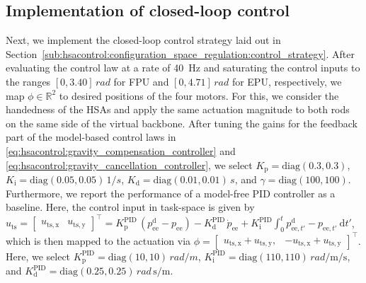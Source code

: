 \subsection{Implementation of closed-loop control}
Next, we implement the closed-loop control strategy laid out in Section~\ref{sub:hsacontrol:configuration_space_regulation:control_strategy}.
After evaluating the control law at a rate of \SI{40}{Hz} and saturating the control inputs to the ranges $[0, 3.40] \, \si{rad}$ for FPU and $[0, 4.71] \, \si{rad}$ for EPU, respectively, we map $\phi \in \mathbb{R}^2$ to desired positions of the four motors. For this, we consider the handedness of the \glspl{HSA} and apply the same actuation magnitude to both rods on the same side of the virtual backbone.
After tuning the gains for the feedback part of the model-based control laws in \eqref{eq:hsacontrol:gravity_compensation_controller} and \eqref{eq:hsacontrol:gravity_cancellation_controller}, we select $K_\mathrm{p} = \mathrm{diag}(0.3, 0.3)$, $K_\mathrm{i} = \mathrm{diag}(0.05, 0.05) \, \si{1 \per s}$, $K_\mathrm{d} = \mathrm{diag}(0.01, 0.01) \, \si{s}$, and $\gamma = \mathrm{diag}(100, 100)$. 
Furthermore, we report the performance of a model-free PID controller as a baseline. Here, the control input in task-space is given by $u_\mathrm{ts} = \begin{bmatrix}u_\mathrm{ts,x} & u_\mathrm{ts,y}\end{bmatrix}^\top = K_\mathrm{p}^\mathrm{PID} \, (p_\mathrm{ee}^\mathrm{d}-p_\mathrm{ee}) - K_\mathrm{d}^\mathrm{PID} \, \dot{p}_\mathrm{ee} + K_\mathrm{i}^\mathrm{PID} \int_0^t p_{\mathrm{ee},t'}^\mathrm{d} - p_{\mathrm{ee},t'} \: \mathrm{d}t'$, which is then mapped to the actuation via $\phi = \begin{bmatrix}
    u_\mathrm{ts,x}+u_\mathrm{ts,y}, & -u_\mathrm{ts,x}+u_\mathrm{ts,y}
\end{bmatrix}^\top$.
Here, we select $K_\mathrm{p}^\mathrm{PID} = \mathrm{diag}(10, 10) \, \si{rad \per m}$, $ K_\mathrm{i}^\mathrm{PID} = \mathrm{diag}(110, 110) \, \si{rad \per \meter \per \second}$, and $ K_\mathrm{d}^\mathrm{PID} = \mathrm{diag}(0.25, 0.25) \, \si{rad \, \second \per \meter}$.
\\


